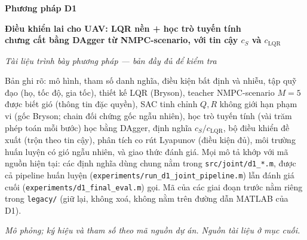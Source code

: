 \documentclass[11pt]{article}
\newcommand{\cS}{c_{S}}
\newcommand{\cL}{c_{\mathrm{LQR}}}
\begin{document}
\sloppy

\begin{titlepage}
\centering
\vspace*{3cm}
{\color{navy}\Huge\bfseries Phương pháp D1\par}
\vspace{0.8cm}
{\LARGE\bfseries Điều khiển lai cho UAV: LQR nền + học trò tuyến tính\\[2mm]
chưng cất bằng DAgger từ NMPC-scenario, với tin cậy $\cS$ và $\cL$\par}
\vspace{1.2cm}
{\large\itshape Tài liệu trình bày phương pháp — bản đầy đủ để kiểm tra\par}
\vspace{2.5cm}
\begin{minipage}{0.85\textwidth}\centering
Bản ghi rõ: mô hình, tham số danh nghĩa, điều kiện bất định và nhiễu, tập quỹ đạo (họ, tốc độ,
gia tốc), thiết kế LQR (Bryson), teacher NMPC-scenario $M{=}5$ được biết gió (thông tin đặc quyền), SAC
tinh chỉnh $Q,R$ không giới hạn phạm vi (gốc Bryson; chain đối chứng gốc ngẫu nhiên), học trò tuyến tính (vài trăm phép toán mỗi bước) học bằng DAgger, định nghĩa
$\cS/\cL$, bộ điều khiển đề xuất (trộn theo tin cậy), phân tích co rút Lyapunov (điều kiện đủ), môi trường
huấn luyện có gió ngẫu nhiên, và giao thức đánh giá. Mọi mô tả khớp với mã nguồn hiện tại: các định nghĩa
dùng chung nằm trong \texttt{src/joint/d1\_*.m}, được cả pipeline huấn luyện
(\texttt{experiments/\allowbreak run\_d1\_joint\_pipeline.m}) lẫn đánh giá cuối
(\texttt{experiments/\allowbreak d1\_final\_eval.m}) gọi. Mã của các giai đoạn trước nằm riêng trong
\texttt{legacy/} (giữ lại, không xoá, không nằm trên đường dẫn MATLAB của D1).
\end{minipage}
\vfill
{\itshape\small Mô phỏng; ký hiệu và tham số theo mã nguồn dự án. Nguồn tài liệu ở mục cuối.\par}
\end{titlepage}

\end{document}
